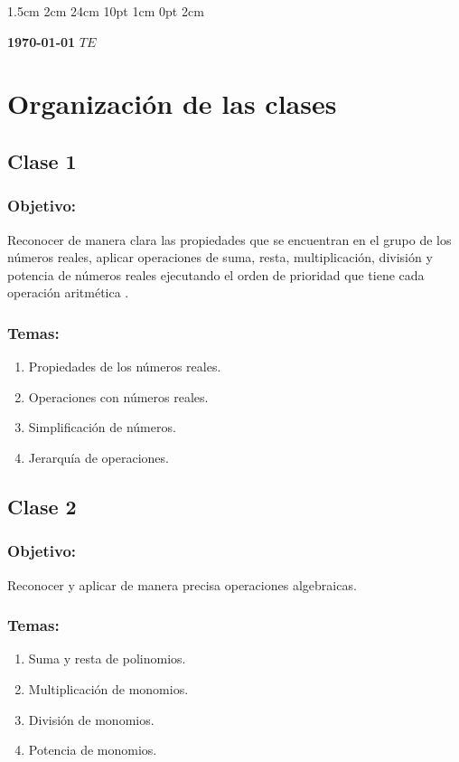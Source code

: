 \documentclass[12pt,letterpaper]{report}
\begin{document}
\setmargins{2.5cm}      
{1.5cm}                     
{2cm}  
{24cm}                    
{10pt}                          
{1cm}                          
{0pt}                             
{2cm}
\begin{flushright}
\textbf{\today} $TE$
\end{flushright}
\vspace{-1.8cm}
\section*{Organización de las clases}
\subsection*{Clase 1}
\subsubsection*{Objetivo:}
Reconocer de manera clara las propiedades que se encuentran en el grupo de los números reales, aplicar operaciones de suma, resta, multiplicación, división y potencia de números reales ejecutando el orden de prioridad que tiene cada operación aritmética .
\subsubsection*{Temas:}
\begin{enumerate}
    \item Propiedades de los números reales.
    \item Operaciones con números reales. 
    \item Simplificación de números.
    \item Jerarquía de operaciones.
\end{enumerate}
\subsection*{Clase 2}
\subsubsection*{Objetivo:}
Reconocer y aplicar de manera precisa operaciones algebraicas.
\subsubsection*{Temas:}
\begin{enumerate}
    \item Suma y resta de polinomios.
    \item Multiplicación de monomios.
    \item División de monomios.
    \item Potencia de monomios.
\end{enumerate}
\end{document}
